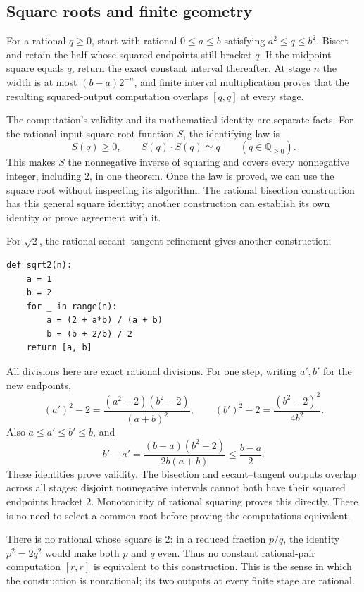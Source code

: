 \subsection{Square roots and finite geometry}
\label{rem:algebraic-numbers-sqrt-two}
For a rational $q\ge0$, start with rational $0\le a\le b$ satisfying
$a^2\le q\le b^2$.  Bisect and retain the half whose squared endpoints
still bracket $q$.  If the midpoint square equals $q$, return the exact
constant interval thereafter.  At stage $n$ the width is at most
$(b-a)2^{-n}$, and finite interval multiplication proves that the resulting
squared-output computation overlaps $[q,q]$ at every stage.

The computation's validity and its mathematical identity are separate facts.
For the rational-input square-root function \(S\), the identifying law is
\[
 S(q)\ge0,\qquad S(q)\cdot S(q)\simeq q
 \qquad(q\in\mathbb Q_{\ge0}).
\]
This makes \(S\) the nonnegative inverse of squaring and covers every
nonnegative integer, including \(2\), in one theorem. Once the law is
proved, we can use the square root without inspecting its algorithm. The
rational bisection construction has this general square identity; another
construction can establish its own identity or prove agreement with it.

For $\sqrt2$, the rational secant--tangent refinement gives another
construction:
\begin{verbatim}
def sqrt2(n):
    a = 1
    b = 2
    for _ in range(n):
        a = (2 + a*b) / (a + b)
        b = (b + 2/b) / 2
    return [a, b]
\end{verbatim}
All divisions here are exact rational divisions.  For one step, writing
$a',b'$ for the new endpoints,
\[
 (a')^2-2=\frac{(a^2-2)(b^2-2)}{(a+b)^2},\qquad
 (b')^2-2=\frac{(b^2-2)^2}{4b^2}.
\]
Also $a\le a'\le b'\le b$, and
\[
 b'-a'=\frac{(b-a)(b^2-2)}{2b(a+b)}\le\frac{b-a}{2}.
\]
These identities prove validity.  The bisection and secant--tangent
outputs overlap across all stages: disjoint nonnegative intervals cannot
both have their squared endpoints bracket $2$.  Monotonicity of rational
squaring proves this directly.  There is no need to select a common root
before proving the computations equivalent.

There is no rational whose square is $2$: in a reduced fraction $p/q$, the
identity $p^2=2q^2$ would make both $p$ and $q$ even.  Thus no constant
rational-pair computation $[r,r]$ is equivalent to this construction.
This is the sense in which the construction is nonrational; its two
outputs at every finite stage are rational.

